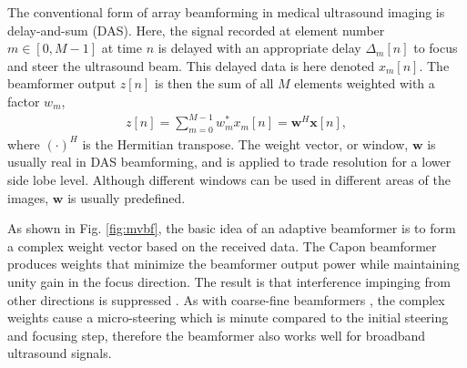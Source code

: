 \documentclass[journal]{IEEEtran}
\newcommand{\mat}[1]{\mathbf{#1}}
\renewcommand{\vec}[1]{\mathbf{#1}}
\begin{document}





The conventional form of array beamforming in medical ultrasound imaging is delay-and-sum (DAS). Here, the signal recorded at element number $m \in [0,M-1]$ at time $n$ is delayed with an appropriate delay $\Delta_m[n]$ to focus and steer the ultrasound beam. This delayed data is here denoted $x_m[n]$. The beamformer output $z[n]$ is then the sum of all $M$ elements weighted with a factor $w_m$,
\begin{align}
z[n] = \sum_{m = 0}^{M-1}w_m^*x_m[n] = \vec{w}^H\vec{x}[n], \label{eq:z}
\end{align}
where $(\cdot)^H$ is the Hermitian transpose. The weight vector, or window, $\vec{w}$ is usually real in DAS beamforming, and is applied to trade resolution for a lower side lobe level. Although different windows can be used in different areas of the images, $\vec{w}$ is usually predefined.

As shown in Fig. \ref{fig:mvbf}, the basic idea of an adaptive beamformer is to form a complex weight vector based on the received data.   The Capon beamformer produces weights that minimize the beamformer output power while maintaining unity gain in the focus direction. The result is that interference impinging from other directions is suppressed \cite{Synnevag2007}. As with coarse-fine beamformers \cite{Thomenius}, the complex weights cause a micro-steering which is minute compared to the initial steering and focusing step, therefore the beamformer also works well for broadband ultrasound signals.

\end{document}
